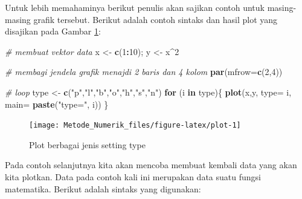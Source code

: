 \documentclass[
]{book}
\newenvironment{Shaded}{\begin{snugshade}}{\end{snugshade}}
\newcommand{\AttributeTok}[1]{\textcolor[rgb]{0.13,0.29,0.53}{#1}}
\newcommand{\CommentTok}[1]{\textcolor[rgb]{0.56,0.35,0.01}{\textit{#1}}}
\newcommand{\ControlFlowTok}[1]{\textcolor[rgb]{0.13,0.29,0.53}{\textbf{#1}}}
\newcommand{\DecValTok}[1]{\textcolor[rgb]{0.00,0.00,0.81}{#1}}
\newcommand{\FunctionTok}[1]{\textcolor[rgb]{0.13,0.29,0.53}{\textbf{#1}}}
\newcommand{\NormalTok}[1]{#1}
\newcommand{\OtherTok}[1]{\textcolor[rgb]{0.56,0.35,0.01}{#1}}
\newcommand{\SpecialCharTok}[1]{\textcolor[rgb]{0.81,0.36,0.00}{\textbf{#1}}}
\newcommand{\StringTok}[1]{\textcolor[rgb]{0.31,0.60,0.02}{#1}}
\theoremstyle{definition}
\theoremstyle{definition}
\theoremstyle{definition}
\theoremstyle{definition}
\theoremstyle{remark}
\begin{document}
Untuk lebih memahaminya berikut penulis akan sajikan contoh untuk masing-masing grafik tersebut. Berikut adalah contoh sintaks dan hasil plot yang disajikan pada Gambar \ref{fig:plot}:

\begin{Shaded}
\begin{Highlighting}[]
\CommentTok{\# membuat vektor data }
\NormalTok{x }\OtherTok{\textless{}{-}} \FunctionTok{c}\NormalTok{(}\DecValTok{1}\SpecialCharTok{:}\DecValTok{10}\NormalTok{); y }\OtherTok{\textless{}{-}}\NormalTok{ x}\SpecialCharTok{\^{}}\DecValTok{2}
\end{Highlighting}
\end{Shaded}

\begin{Shaded}
\begin{Highlighting}[]
\CommentTok{\# membagi jendela grafik menajdi 2 baris dan 4 kolom}
\FunctionTok{par}\NormalTok{(}\AttributeTok{mfrow=}\FunctionTok{c}\NormalTok{(}\DecValTok{2}\NormalTok{,}\DecValTok{4}\NormalTok{))}

\CommentTok{\# loop}
\NormalTok{type }\OtherTok{\textless{}{-}} \FunctionTok{c}\NormalTok{(}\StringTok{"p"}\NormalTok{,}\StringTok{"l"}\NormalTok{,}\StringTok{"b"}\NormalTok{,}\StringTok{"o"}\NormalTok{,}\StringTok{"h"}\NormalTok{,}\StringTok{"s"}\NormalTok{,}\StringTok{"n"}\NormalTok{)}
\ControlFlowTok{for}\NormalTok{ (i }\ControlFlowTok{in}\NormalTok{ type)\{}
  \FunctionTok{plot}\NormalTok{(x,y, }\AttributeTok{type=}\NormalTok{ i,}
       \AttributeTok{main=} \FunctionTok{paste}\NormalTok{(}\StringTok{"type="}\NormalTok{, i))}
\NormalTok{\}}
\end{Highlighting}
\end{Shaded}

\begin{figure}

{\centering \texttt{[image: Metode\_Numerik\_files/figure-latex/plot-1]} 

}

\caption{Plot berbagai jenis setting type}\label{fig:plot}
\end{figure}

Pada contoh selanjutnya kita akan mencoba membuat kembali data yang akan kita plotkan. Data pada contoh kali ini merupakan data suatu fungsi matematika. Berikut adalah sintaks yang digunakan:
\end{document}
